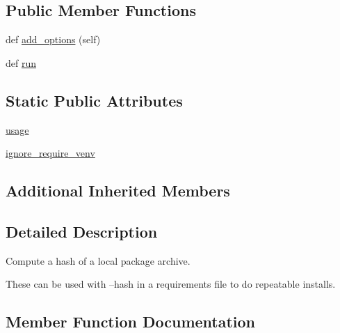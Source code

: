 \subsection*{Public Member Functions}
\begin{DoxyCompactItemize}
\item 
def \hyperlink{classpip_1_1__internal_1_1commands_1_1hash_1_1HashCommand_ae8cd504b36304ec05d53edb8d8a4345a}{add\+\_\+options} (self)
\item 
def \hyperlink{classpip_1_1__internal_1_1commands_1_1hash_1_1HashCommand_a594adb234b85905ce9c0b9043b074441}{run}
\end{DoxyCompactItemize}
\subsection*{Static Public Attributes}
\begin{DoxyCompactItemize}
\item 
\hyperlink{classpip_1_1__internal_1_1commands_1_1hash_1_1HashCommand_a2ca41abc81c6a14725e05284e07b0969}{usage}
\item 
\hyperlink{classpip_1_1__internal_1_1commands_1_1hash_1_1HashCommand_a91d375cfb8c4f476b1521ac20c8cc759}{ignore\+\_\+require\+\_\+venv}
\end{DoxyCompactItemize}
\subsection*{Additional Inherited Members}


\subsection{Detailed Description}
\begin{DoxyVerb}Compute a hash of a local package archive.

These can be used with --hash in a requirements file to do repeatable
installs.
\end{DoxyVerb}
 

\subsection{Member Function Documentation}
\mbox{\label{classpip_1_1__internal_1_1commands_1_1hash_1_1HashCommand_ae8cd504b36304ec05d53edb8d8a4345a}} 
